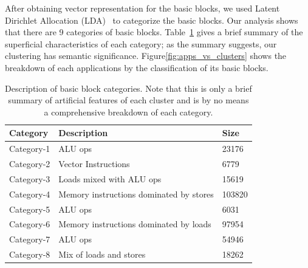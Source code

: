 After obtaining vector representation for the basic blocks, 
we used Latent Dirichlet Allocation (LDA)~\cite{lda} to categorize the basic blocks.
Our analysis shows that there are 9 categories of basic blocks.
Table~\ref{tab:categories} gives a brief summary of the superficial characteristics
of each category; as the summary suggests, our clustering has semantic significance.
Figure\ref{fig:apps_vs_clusters} shows the breakdown of each applications
by the classification of its basic blocks.
\begin{table}
\begin{tabular}{|p{}|p{}|p{}|}
    \hline
    Category & Description & Size \\
    \hline
    
    Category-1 & 
    ALU ops & 23176 \\
    \hline
    
    Category-2 &
    Vector Instructions & 6779 \\
    \hline
    
    Category-3 &
    Loads mixed with ALU ops & 15619 \\
    \hline
    
    Category-4 &
    Memory instructions dominated by stores & 103820 \\
    \hline
    
    Category-5 &
    ALU ops & 6031 \\
    \hline
    
    Category-6 &
    Memory instructions dominated by loads & 97954 \\
    \hline
    
    Category-7 &
    ALU ops & 54946 \\
    \hline
    
    Category-8 &
    Mix of loads and stores & 18262 \\
    \hline
\end{tabular}
\\
\caption{Description of basic block categories. Note that this is only a brief
summary of artificial features of each cluster and is by no means a comprehensive
breakdown of each category.}
\label{tab:categories}

\end{table}

